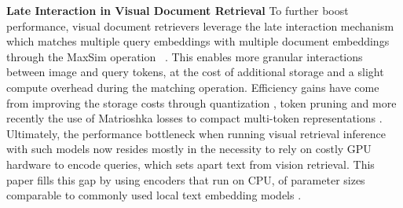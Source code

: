 \noindent\textbf{Late Interaction in Visual Document Retrieval}  To further boost performance, visual document retrievers leverage the late interaction mechanism~\citep{khattab_colbert_2020} which matches multiple query embeddings with multiple document embeddings through the MaxSim operation ~\citep{faysse2025colpaliefficientdocumentretrieval,günther2025jinaembeddingsv4universalembeddingsmultimodal, xu2025llamanemoretrievercolembedtopperforming}. This enables more granular interactions between image and query tokens, at the cost of additional storage and a slight compute overhead during the matching operation. Efficiency gains have come from improving the storage costs through quantization \citep{vespaScalingColPali}, token pruning \citep{faysse_croissantllm_2024} and more recently the use of Matrioshka losses to compact multi-token representations \citep{xiao2025metaembedscalingmultimodalretrieval}. Ultimately, the performance bottleneck when running visual retrieval inference with such models now resides mostly in the necessity to rely on costly GPU hardware to encode queries, which sets apart text from vision retrieval. This paper fills this gap by using encoders that run on CPU, of parameter sizes comparable to commonly used local text embedding models \citep{chen_bge_2024, enevoldsen2025mmtebmassivemultilingualtext}.




